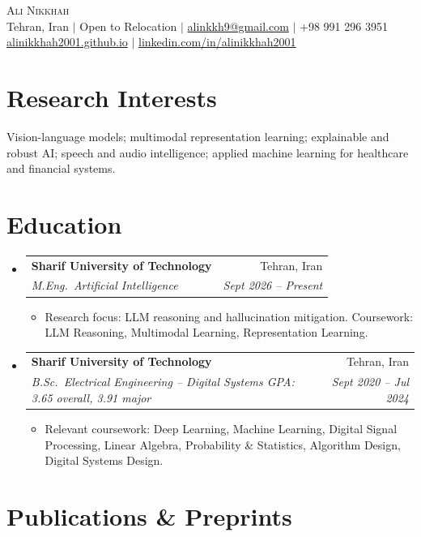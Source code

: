 \documentclass[letterpaper,11pt]{article}
\makeatletter
\newcommand{\resumeItem}[1]{
  \item\small{#1 \vspace{-2pt}}
}
\newcommand{\resumeSubheading}[4]{
  \vspace{-2pt}\item
  \begin{tabular*}{0.97\textwidth}[t]{l@{\extracolsep{\fill}}r}
    \textbf{#1} & \small #2 \\
    \textit{\small#3} & \textit{\small #4} \\
  \end{tabular*}\vspace{-7pt}
}
\newenvironment{resumeSubHeadingList}{\begin{itemize}[leftmargin=0.15in, label={}]}{\end{itemize}}
\newenvironment{resumeItemList}{\begin{itemize}[leftmargin=0.2in]}{\end{itemize}\vspace{-5pt}}
\makeatother
\begin{document}
\begin{center}
  \Huge \textsc{Ali Nikkhah} \\ \vspace{2pt}
  \small
  Tehran, Iran $|$ Open to Relocation $|$
  \href{mailto:alinkkh9@gmail.com}{alinkkh9@gmail.com} $|$
  +98 991 296 3951 \\
  \href{https://alinikkhah2001.github.io}{alinikkhah2001.github.io} $|$
  \href{https://linkedin.com/in/alinikkhah2001}{linkedin.com/in/alinikkhah2001}
\end{center}

\section{Research Interests}
\small{Vision-language models; multimodal representation learning; explainable and robust AI; speech and audio intelligence; applied machine learning for healthcare and financial systems.}
\vspace{4pt}

\section{Education}
\begin{resumeSubHeadingList}
  \resumeSubheading
    {Sharif University of Technology}{Tehran, Iran}
    {M.Eng.\ Artificial Intelligence}{Sept 2026 -- Present}
  \begin{resumeItemList}
    \resumeItem{Research focus: LLM reasoning and hallucination mitigation. Coursework: LLM Reasoning, Multimodal Learning, Representation Learning.}
  \end{resumeItemList}

  \resumeSubheading
    {Sharif University of Technology}{Tehran, Iran}
    {B.Sc.\ Electrical Engineering -- Digital Systems \quad GPA: 3.65 overall, 3.91 major}{Sept 2020 -- Jul 2024}
  \begin{resumeItemList}
    \resumeItem{Relevant coursework: Deep Learning, Machine Learning, Digital Signal Processing, Linear Algebra, Probability \& Statistics, Algorithm Design, Digital Systems Design.}
  \end{resumeItemList}
\end{resumeSubHeadingList}

\section{Publications \& Preprints}
\begin{itemize}[leftmargin=0.15in, label={}]
  
\end{itemize}
\end{document}
